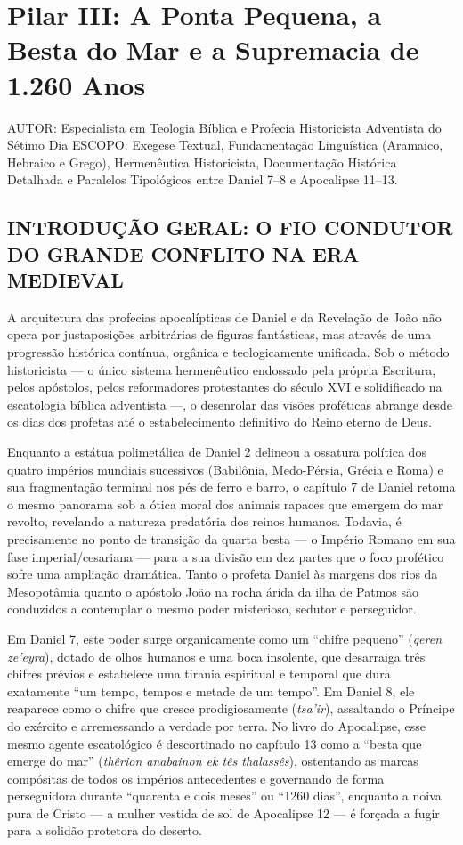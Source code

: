 \chapter{Pilar III: A Ponta Pequena, a Besta do Mar e a Supremacia de 1.260 Anos}


AUTOR: Especialista em Teologia Bíblica e Profecia Historicista Adventista do Sétimo Dia
ESCOPO: Exegese Textual, Fundamentação Linguística (Aramaico, Hebraico e Grego), Hermenêutica Historicista, Documentação Histórica Detalhada e Paralelos Tipológicos entre Daniel 7–8 e Apocalipse 11–13.


\section{INTRODUÇÃO GERAL: O FIO CONDUTOR DO GRANDE CONFLITO NA ERA MEDIEVAL}


A arquitetura das profecias apocalípticas de Daniel e da Revelação de João não opera por justaposições arbitrárias de figuras fantásticas, mas através de uma progressão histórica contínua, orgânica e teologicamente unificada. Sob o método historicista — o único sistema hermenêutico endossado pela própria Escritura, pelos apóstolos, pelos reformadores protestantes do século XVI e solidificado na escatologia bíblica adventista —, o desenrolar das visões proféticas abrange desde os dias dos profetas até o estabelecimento definitivo do Reino eterno de Deus.

Enquanto a estátua polimetálica de Daniel 2 delineou a ossatura política dos quatro impérios mundiais sucessivos (Babilônia, Medo-Pérsia, Grécia e Roma) e sua fragmentação terminal nos pés de ferro e barro, o capítulo 7 de Daniel retoma o mesmo panorama sob a ótica moral dos animais rapaces que emergem do mar revolto, revelando a natureza predatória dos reinos humanos. Todavia, é precisamente no ponto de transição da quarta besta — o Império Romano em sua fase imperial/cesariana — para a sua divisão em dez partes que o foco profético sofre uma ampliação dramática. Tanto o profeta Daniel às margens dos rios da Mesopotâmia quanto o apóstolo João na rocha árida da ilha de Patmos são conduzidos a contemplar o mesmo poder misterioso, sedutor e perseguidor.

Em Daniel 7, este poder surge organicamente como um ``chifre pequeno'' (\textit{qeren ze'eyra}), dotado de olhos humanos e uma boca insolente, que desarraiga três chifres prévios e estabelece uma tirania espiritual e temporal que dura exatamente ``um tempo, tempos e metade de um tempo''. Em Daniel 8, ele reaparece como o chifre que cresce prodigiosamente (\textit{tsa'ir}), assaltando o Príncipe do exército e arremessando a verdade por terra. No livro do Apocalipse, esse mesmo agente escatológico é descortinado no capítulo 13 como a ``besta que emerge do mar'' (\textit{thêrion anabainon ek tês thalassês}), ostentando as marcas compósitas de todos os impérios antecedentes e governando de forma perseguidora durante ``quarenta e dois meses'' ou ``1260 dias'', enquanto a noiva pura de Cristo — a mulher vestida de sol de Apocalipse 12 — é forçada a fugir para a solidão protetora do deserto.


